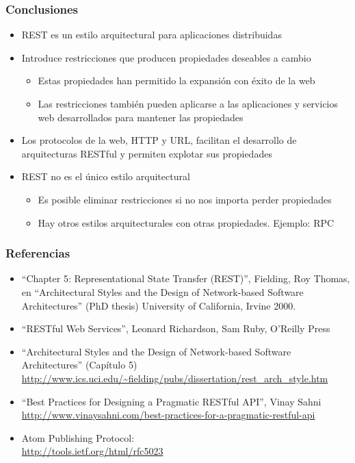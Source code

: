 \begin{frame}
\frametitle{Conclusiones}

\begin{itemize}
\item REST es un estilo arquitectural para aplicaciones distribuidas
\item Introduce restricciones que producen propiedades deseables a cambio
  \begin{itemize}
  \item Estas propiedades han permitido la expansión con éxito de la web
  \item Las restricciones también pueden aplicarse a las aplicaciones y servicios web desarrollados para mantener las propiedades
  \end{itemize}
\item Los protocolos de la web, HTTP y URL, facilitan el desarrollo de arquitecturas RESTful y permiten explotar sus propiedades
\item REST no es el único estilo arquitectural
  \begin{itemize}
  \item Es posible eliminar restricciones si no nos importa perder propiedades
  \item Hay otros estilos arquitecturales con otras propiedades. Ejemplo: RPC
  \end{itemize}
\end{itemize}

\end{frame}



\begin{frame}
\frametitle{Referencias}

\begin{itemize}
\item ``Chapter 5: Representational State Transfer (REST)'', Fielding, Roy Thomas, en ``Architectural Styles and the Design of Network-based Software Architectures'' (PhD thesis) University of California, Irvine 2000.
\item ``RESTful Web Services'',  Leonard Richardson, Sam Ruby, O'Reilly Press
\item ``Architectural Styles and the Design of Network-based Software Architectures'' (Capítulo 5) \\
  {\footnotesize \url{http://www.ics.uci.edu/~fielding/pubs/dissertation/rest_arch_style.htm}}
\item ``Best Practices for Designing a Pragmatic RESTful API'', 
  Vinay Sahni \\
  {\footnotesize \url{http://www.vinaysahni.com/best-practices-for-a-pragmatic-restful-api}}
\item Atom Publishing Protocol: \\
  \url{http://tools.ietf.org/html/rfc5023}
\end{itemize}
\end{frame}

